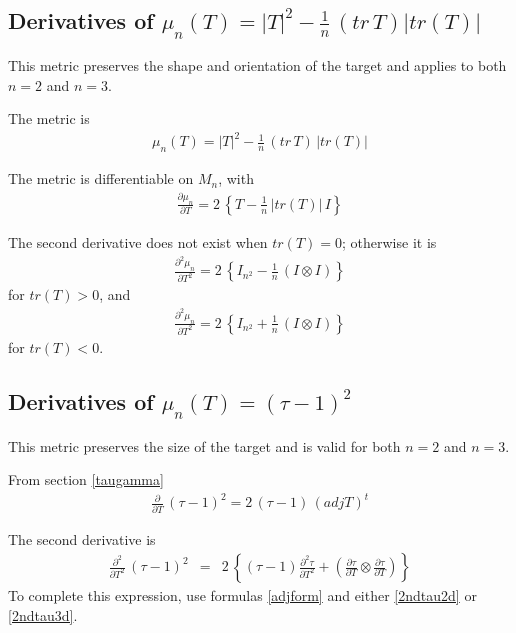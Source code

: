 \documentclass{report}
\begin{document}
\subsection{Derivatives of $\mu_n(T)=|T|^2 - \frac{1}{n} \, (tr \, T) |tr(T)|$ \label{si+}}

This metric preserves the shape and orientation of the target and applies 
to both $n=2$ and $n=3$. \newline

\noindent The metric is
\begin{eqnarray}
\mu_n(T)=|T|^2 - \frac{1}{n} \, (tr \, T) \, |tr(T)|
\end{eqnarray}

\noindent The metric is differentiable on $M_n$, with
\begin{eqnarray}
\frac{\partial \mu_n}{\partial T} = 2 \, \left\{ T - \frac{1}{n} \, |tr(T)| \, I \right\} \label{derv1-si+}
\end{eqnarray}

\noindent The second derivative does not exist when $tr(T)=0$; otherwise 
it is  
\begin{eqnarray}
\frac{\partial^2 \mu_n}{\partial T^2} = 2 \, \left\{ I_{n^2} - \frac{1}{n} \, \left( I \otimes I \right) \right\}
\end{eqnarray}
for $tr(T) > 0$, and 
\begin{eqnarray}
\frac{\partial^2 \mu_n}{\partial T^2} = 2 \, \left\{ I_{n^2} + \frac{1}{n} \, \left( I \otimes I \right) \right\}
\end{eqnarray}
for $tr(T) < 0$. \newline

\subsection{Derivatives of $\mu_n(T) = (\tau-1)^2$ \label{tausqr} }

\noindent This metric preserves the size of the target and is valid for both $n=2$ and $n=3$. \newline

\noindent From section \ref{taugamma}
\begin{eqnarray}
\frac{\partial}{\partial T} \, (\tau-1)^2 = 2 \, (\tau-1) \, (adj T)^t
\end{eqnarray}

\noindent The second derivative is
\begin{eqnarray}
\frac{\partial^2}{\partial T^2} \, (\tau-1)^2 & = & 2 \, \left\{ (\tau-1) \frac{\partial^2 \tau}{\partial T^2} + \left( \frac{\partial \tau}{\partial T} \otimes \frac{\partial \tau}{\partial T} \right) \right\}
\end{eqnarray}
To complete this expression, use formulas \ref{adjform} and either 
\ref{2ndtau2d} or \ref{2ndtau3d}. \newline
\end{document}
